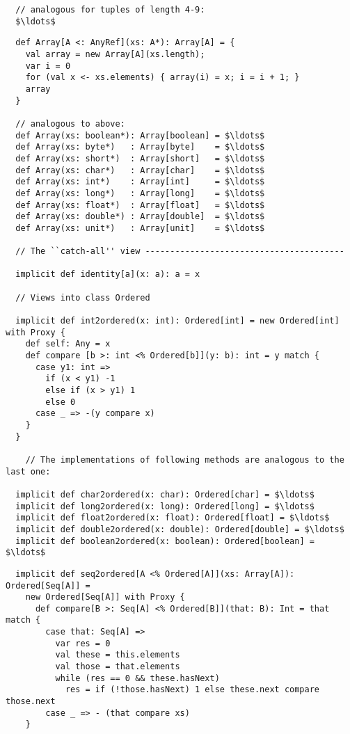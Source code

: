 {\begin{lstlisting}
  // analogous for tuples of length 4-9:
  $\ldots$

\end{lstlisting}
\newpage
\begin{lstlisting}
  def Array[A <: AnyRef](xs: A*): Array[A] = {
    val array = new Array[A](xs.length);
    var i = 0
    for (val x <- xs.elements) { array(i) = x; i = i + 1; }
    array
  }

  // analogous to above:
  def Array(xs: boolean*): Array[boolean] = $\ldots$
  def Array(xs: byte*)   : Array[byte]    = $\ldots$
  def Array(xs: short*)  : Array[short]   = $\ldots$
  def Array(xs: char*)   : Array[char]    = $\ldots$
  def Array(xs: int*)    : Array[int]     = $\ldots$
  def Array(xs: long*)   : Array[long]    = $\ldots$
  def Array(xs: float*)  : Array[float]   = $\ldots$
  def Array(xs: double*) : Array[double]  = $\ldots$
  def Array(xs: unit*)   : Array[unit]    = $\ldots$

  // The ``catch-all'' view ----------------------------------------

  implicit def identity[a](x: a): a = x

  // Views into class Ordered

  implicit def int2ordered(x: int): Ordered[int] = new Ordered[int] with Proxy {
    def self: Any = x
    def compare [b >: int <% Ordered[b]](y: b): int = y match {
      case y1: int =>
        if (x < y1) -1
        else if (x > y1) 1
        else 0
      case _ => -(y compare x)
    }
  }

    // The implementations of following methods are analogous to the last one:

  implicit def char2ordered(x: char): Ordered[char] = $\ldots$ 
  implicit def long2ordered(x: long): Ordered[long] = $\ldots$ 
  implicit def float2ordered(x: float): Ordered[float] = $\ldots$
  implicit def double2ordered(x: double): Ordered[double] = $\ldots$
  implicit def boolean2ordered(x: boolean): Ordered[boolean] = $\ldots$

\end{lstlisting}
\newpage
\begin{lstlisting}
  implicit def seq2ordered[A <% Ordered[A]](xs: Array[A]): Ordered[Seq[A]] = 
    new Ordered[Seq[A]] with Proxy {
      def compare[B >: Seq[A] <% Ordered[B]](that: B): Int = that match {
        case that: Seq[A] =>
          var res = 0
          val these = this.elements
          val those = that.elements
          while (res == 0 && these.hasNext)
            res = if (!those.hasNext) 1 else these.next compare those.next
        case _ => - (that compare xs)
    }


\end{lstlisting}}
